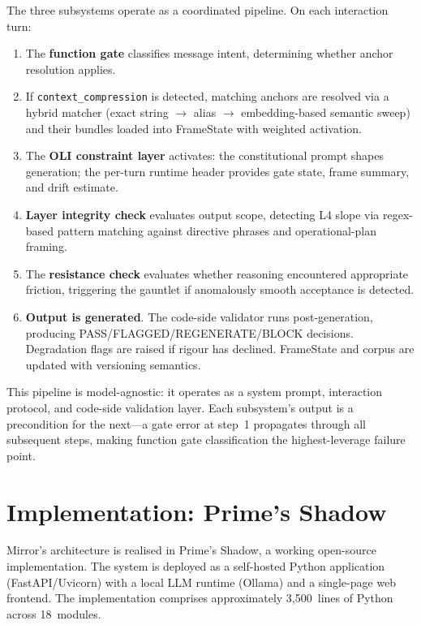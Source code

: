 \documentclass[11pt,a4paper]{article}
\begin{document}
The three subsystems operate as a coordinated pipeline.
On each interaction turn:
\begin{enumerate}[leftmargin=2em]
    \item The \textbf{function gate} classifies message intent, determining whether anchor resolution applies.
    \item If \texttt{context\_compression} is detected, matching anchors are resolved via a hybrid matcher (exact string $\to$ alias $\to$ embedding-based semantic sweep) and their bundles loaded into FrameState with weighted activation.
    \item The \textbf{OLI constraint layer} activates: the constitutional prompt shapes generation; the per-turn runtime header provides gate state, frame summary, and drift estimate.
    \item \textbf{Layer integrity check} evaluates output scope, detecting L4 slope via regex-based pattern matching against directive phrases and operational-plan framing.
    \item The \textbf{resistance check} evaluates whether reasoning encountered appropriate friction, triggering the gauntlet if anomalously smooth acceptance is detected.
    \item \textbf{Output is generated}. The code-side validator runs post-generation, producing PASS/FLAGGED/REGENERATE/BLOCK decisions. Degradation flags are raised if rigour has declined. FrameState and corpus are updated with versioning semantics.
\end{enumerate}

This pipeline is model-agnostic: it operates as a system prompt, interaction protocol, and code-side validation layer.
Each subsystem's output is a precondition for the next---a gate error at step~1 propagates through all subsequent steps, making function gate classification the highest-leverage failure point.

\section{Implementation: Prime's Shadow}
\label{sec:implementation}

Mirror's architecture is realised in Prime's Shadow, a working open-source implementation.
The system is deployed as a self-hosted Python application (FastAPI/Uvicorn) with a local LLM runtime (Ollama) and a single-page web frontend.
The implementation comprises approximately 3{,}500~lines of Python across 18~modules.
\end{document}
